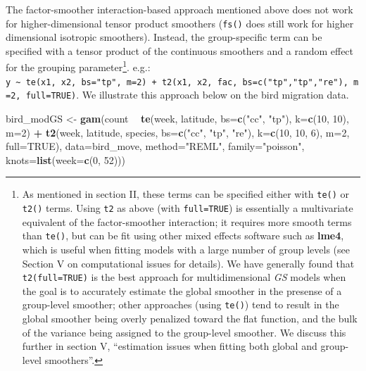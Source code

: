 \documentclass[12pt]{article}
\newenvironment{Shaded}{\begin{snugshade}}{\end{snugshade}}
\newcommand{\KeywordTok}[1]{\textcolor[rgb]{0.13,0.29,0.53}{\textbf{#1}}}
\newcommand{\DataTypeTok}[1]{\textcolor[rgb]{0.13,0.29,0.53}{#1}}
\newcommand{\DecValTok}[1]{\textcolor[rgb]{0.00,0.00,0.81}{#1}}
\newcommand{\StringTok}[1]{\textcolor[rgb]{0.31,0.60,0.02}{#1}}
\newcommand{\OtherTok}[1]{\textcolor[rgb]{0.56,0.35,0.01}{#1}}
\newcommand{\OperatorTok}[1]{\textcolor[rgb]{0.81,0.36,0.00}{\textbf{#1}}}
\newcommand{\NormalTok}[1]{#1}
\let\rmarkdownfootnote\footnote%
\def\footnote{\protect\rmarkdownfootnote}
\begin{document}
The factor-smoother interaction-based approach mentioned above does not
work for higher-dimensional tensor product smoothers (\texttt{fs()} does
still work for higher dimensional isotropic smoothers). Instead, the
group-specific term can be specified with a tensor product of the
continuous smoothers and a random effect for the grouping
parameter\footnote{As mentioned in section II, these terms can be
  specified either with \texttt{te()} or \texttt{t2()} terms. Using
  \texttt{t2} as above (with \texttt{full=TRUE}) is essentially a
  multivariate equivalent of the factor-smoother interaction; it
  requires more smooth terms than \texttt{te()}, but can be fit using
  other mixed effects software such as \textbf{lme4}, which is useful
  when fitting models with a large number of group levels (see Section V
  on computational issues for details). We have generally found that
  \texttt{t2(full=TRUE)} is the best approach for multidimensional
  \emph{GS} models when the goal is to accurately estimate the global
  smoother in the presense of a group-level smoother; other approaches
  (using \texttt{te()}) tend to result in the global smoother being
  overly penalized toward the flat function, and the bulk of the
  variance being assigned to the group-level smoother. We discuss this
  further in section V, ``estimation issues when fitting both global and
  group-level smoothers''.}. e.g.:
\texttt{y\ \textasciitilde{}\ te(x1,\ x2,\ bs="tp",\ m=2)\ +\ t2(x1,\ x2,\ fac,\ bs=c("tp","tp","re"),\ m=2,\ full=TRUE)}.
We illustrate this approach below on the bird migration data.

\begin{Shaded}
\begin{Highlighting}[]
\NormalTok{bird_modGS <-}\StringTok{ }\KeywordTok{gam}\NormalTok{(count }\OperatorTok{~}\StringTok{ }\KeywordTok{te}\NormalTok{(week, latitude, }\DataTypeTok{bs=}\KeywordTok{c}\NormalTok{(}\StringTok{"cc"}\NormalTok{, }\StringTok{"tp"}\NormalTok{),}
                             \DataTypeTok{k=}\KeywordTok{c}\NormalTok{(}\DecValTok{10}\NormalTok{, }\DecValTok{10}\NormalTok{), }\DataTypeTok{m=}\DecValTok{2}\NormalTok{) }\OperatorTok{+}
\StringTok{                    }\KeywordTok{t2}\NormalTok{(week, latitude, species, }\DataTypeTok{bs=}\KeywordTok{c}\NormalTok{(}\StringTok{"cc"}\NormalTok{, }\StringTok{"tp"}\NormalTok{, }\StringTok{"re"}\NormalTok{),}
                       \DataTypeTok{k=}\KeywordTok{c}\NormalTok{(}\DecValTok{10}\NormalTok{, }\DecValTok{10}\NormalTok{, }\DecValTok{6}\NormalTok{), }\DataTypeTok{m=}\DecValTok{2}\NormalTok{, }\DataTypeTok{full=}\OtherTok{TRUE}\NormalTok{),}
                  \DataTypeTok{data=}\NormalTok{bird_move, }\DataTypeTok{method=}\StringTok{"REML"}\NormalTok{, }\DataTypeTok{family=}\StringTok{"poisson"}\NormalTok{, }
                  \DataTypeTok{knots=}\KeywordTok{list}\NormalTok{(}\DataTypeTok{week=}\KeywordTok{c}\NormalTok{(}\DecValTok{0}\NormalTok{, }\DecValTok{52}\NormalTok{)))}
\end{Highlighting}
\end{Shaded}
\end{document}
